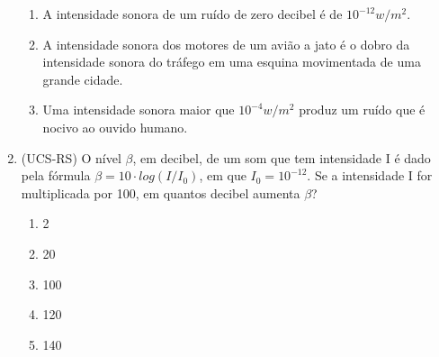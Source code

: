 \begin{enumerate}
\begin{enumerate}
\item A intensidade sonora de um ruído de zero decibel é de $10^{-12} w/m^2$. 

\item A intensidade sonora dos motores de um avião a jato é o dobro da intensidade sonora do tráfego em uma esquina movimentada de uma grande cidade.

\item Uma intensidade sonora maior que $10^{-4} w/m^2$ produz um ruído que é nocivo ao ouvido humano. 
\end{enumerate}


\item {}\label{UCSSRS}

(UCS-RS) O nível $\beta$, em decibel, de um som que tem intensidade I é dado pela fórmula $\beta = 10 \cdot log 
(I/I_0)$, em que $I_0 = 10^{-12}$. Se a intensidade I for multiplicada por 100, em quantos decibel aumenta $\beta$?

\begin{enumerate}
    \item 2
    \item 20
    \item 100
    \item 120
    \item 140
\end{enumerate}
\end{enumerate}

